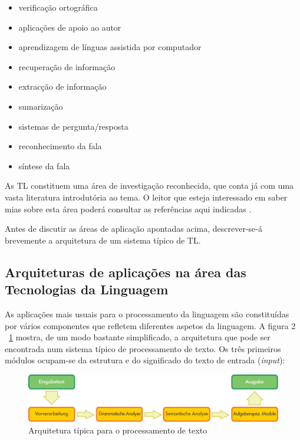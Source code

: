 \begin{multicols}{2}
\begin{itemize}
      \item verificação ortográfica
      \item aplicações de apoio ao autor
      \item aprendizagem de línguas assistida por computador
      \item recuperação de informação 
      \item extracção de informação
      \item sumarização
      \item sistemas de pergunta/resposta
      \item reconhecimento da fala 
      \item síntese da fala 
\end{itemize}

As TL constituem uma área de investigação reconhecida, que conta já com uma vasta literatura introdutória ao tema. O leitor que esteja interessado em saber mias sobre esta área poderá consultar as referências aqui indicadas \cite{carstensen-etal1} \cite{jurafsky-martin01} \cite{manning-schuetze1} \cite{lt-world1} \cite{lt-survey1}.

 Antes de discutir as áreas de aplicação apontadas acima, descrever-se-á brevemente a arquitetura de um sistema típico de TL. 

\subsection{Arquiteturas de aplicações na área das Tecnologias da Linguagem}

 As aplicações mais usuais para o processamento da linguagem são constituídas por vários componentes que refletem diferentes aspetos da linguagem. A figura 2 ~\ref{fig:textprocessingarch_de} mostra, de um modo bastante simplificado, a arquitetura que pode ser encontrada num sistema típico de processamento de texto. Os três primeiros módulos ocupam-se da estrutura e do significado do texto de entrada (\textit{input}):

\begin{figure}[htb]
  \center
  \includegraphics[width=\textwidth]{../_media/german/text_processing_app_architecture}
  \caption{Arquitetura típica para o processamento de texto}
  \label{fig:textprocessingarch_de}
\end{figure}


\end{multicols}
